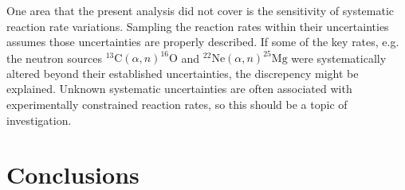 One area that the present analysis did not cover is the sensitivity of systematic reaction rate variations. Sampling the reaction rates within their uncertainties assumes those uncertainties are properly described. If some of the key rates, e.g. the neutron sources $^{13}\mathrm{C}(\alpha,n)^{16}\mathrm{O}$ and $^{22}\mathrm{Ne}(\alpha,n)^{25}\mathrm{Mg}$ were systematically altered beyond their established uncertainties, the discrepency might be explained. Unknown systematic uncertainties are often associated with experimentally constrained reaction rates, so this should be a topic of investigation.






\section{Conclusions}


